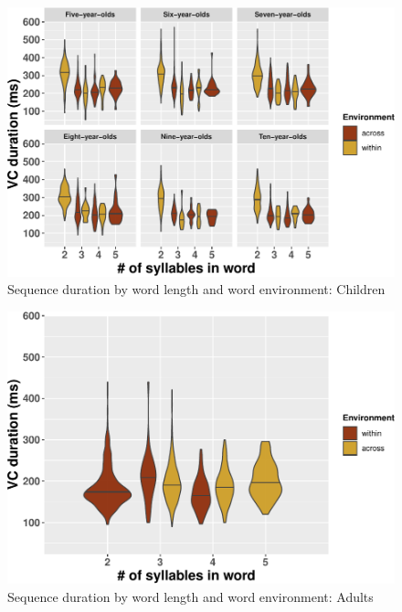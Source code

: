 \documentclass[a4paper,man,floatsintext,natbib,donotrepeattitle, apacite]{apa6}
\begin{document}
\begin{figure}
\centering
\includegraphics{3_ch3_results_files/figure-latex/compshort-kids-1.pdf}
\caption{\label{fig:compshort-kids}Sequence duration by word length and word environment: Children}
\end{figure}

\begin{figure}
\centering
\includegraphics{3_ch3_results_files/figure-latex/compshort-adults-1.pdf}
\caption{\label{fig:compshort-adults}Sequence duration by word length and word environment: Adults}
\end{figure}
\end{document}
